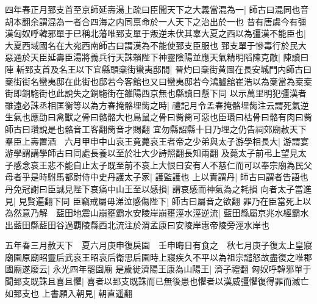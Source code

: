 四年春正月郅支首至京師延壽湯上疏曰臣聞天下之大義當混為一|{
	師古曰混同也音胡本翻余謂混為一者合四海之内同禀命於一人天下之治出於一也}
昔有唐虞今有彊漢匈奴呼韓邪單于已稱北藩唯郅支單于叛逆未伏其辜大夏之西以為彊漢不能臣也|{
	大夏西域國名在大宛西南師古曰謂漢為不能使郅支臣服也}
郅支單于慘毒行於民大惡通於天臣延壽臣湯將義兵行天誅賴陛下神靈陰陽並應天氣精明䧟陳克敵|{
	陳讀曰陣}
斬郅支首及名王以下宜縣頭稾街蠻夷邸間|{
	晉灼曰稾街黄圖在長安城門内師古曰稾街街名蠻夷邸在此街也邸若今客館也又曰蠻夷邸若今鴻臚舘崔浩以為稾當為槖槖街即銅駞街也此說失之銅駞街在雒陽西京無也縣讀曰懸下同}
以示萬里明犯彊漢者雖遠必誅丞相匡衡等以為方春掩骼埋胔之時|{
	禮記月令孟春掩骼埋胔注云謂死氣逆生氣也應劭曰禽獸之骨曰骼骼大也鳥鼠之骨曰胔胔可惡也臣瓚曰枯骨曰骼有肉曰胔師古曰瓚說是也骼音工客翻胔音才賜翻}
宜勿縣詔縣十日乃埋之仍告祠郊廟赦天下羣臣上壽置酒　六月甲申中山哀王竟薨哀王者帝之少弟與太子游學相長大|{
	游謂宴游學謂講學師古曰同處長養以至於壮大少詩照翻長知兩翻}
及薨太子前弔上望見太子感念哀王悲不能自止太子既至前不哀上大恨曰安有人不慈仁而可以奉宗廟為民父母者乎是時駙馬都尉侍中史丹護太子家|{
	護監護也}
上以責謂丹|{
	師古曰謂者告語也}
丹免冠謝曰臣誠見陛下哀痛中山王至以感損|{
	謂哀感而神氣為之耗損}
向者太子當進見|{
	見賢遍翻下同}
臣竊戒屬毋涕泣感傷陛下|{
	師古曰屬音之欲翻}
罪乃在臣當死上以為然意乃解　藍田地震山崩壅霸水安陵岸崩壅涇水涇逆流|{
	藍田縣屬京兆水經霸水出藍田縣藍田谷過覇陵縣西北流注於渭孟康曰安陵岸惠帝陵旁涇水岸也}


五年春三月赦天下　夏六月庚申復戾園　壬申晦日有食之　秋七月庚子復太上皇寢廟園原廟昭靈后武哀王昭哀后衛思后園時上寢疾久不平以為祖宗譴怒故盡復之唯郡國廟遂廢云|{
	永光四年罷園廟}
是歲徙濟陽王康為山陽王|{
	濟子禮翻}
匈奴呼韓邪單于聞郅支既誅且喜且懼|{
	喜者以郅支既誅而已無後患也懼者以漢威彊懼復得罪而滅亡如郅支也}
上書願入朝見|{
	朝直遥翻}


